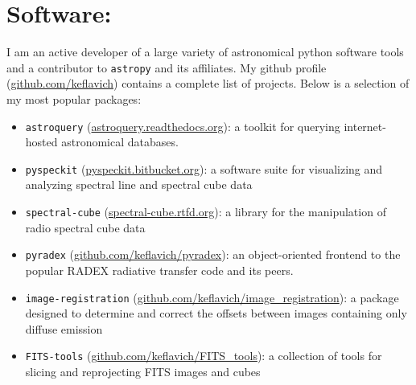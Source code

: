 \section*{Software:}
\vspace{-10pt}
I am an active developer of a large variety of astronomical python software
tools and a contributor to \texttt{astropy} and its affiliates.  My github
profile (\url{github.com/keflavich}) contains a complete list of projects.
Below is a selection of my most popular packages:
\vspace{-10pt}

\begin{itemize}
\itemsep-3pt
    \item \texttt{astroquery} (\url{astroquery.readthedocs.org}):
        a toolkit for querying internet-hosted astronomical databases.
    \item \texttt{pyspeckit} (\url{pyspeckit.bitbucket.org}): a software suite
        for visualizing and analyzing spectral line and spectral cube
        data
    \item \texttt{spectral-cube} (\url{spectral-cube.rtfd.org}): a library for the manipulation
        of radio spectral cube data
    \item \texttt{pyradex} (\url{github.com/keflavich/pyradex}):
        an object-oriented frontend to the popular RADEX radiative transfer code and
        its peers.
    \item \texttt{image-registration} (\url{github.com/keflavich/image_registration}):
        a package designed to determine and correct the offsets between images containing only
        diffuse emission
    \item \texttt{FITS-tools} (\url{github.com/keflavich/FITS_tools}):
        a collection of tools for slicing and reprojecting FITS images and cubes
\end{itemize}

